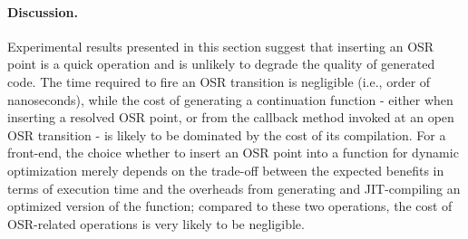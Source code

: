 \paragraph{Discussion.}

Experimental results presented in this section suggest that inserting an OSR point is a quick operation and is unlikely to degrade the quality of generated code. The time required to fire an OSR transition is negligible (i.e., order of nanoseconds), while the cost of generating a continuation function - either when inserting a resolved OSR point, or from the callback method invoked at an open OSR transition - is likely to be dominated by the cost of its compilation. For a front-end, the choice whether to insert an OSR point into a function for dynamic optimization merely depends on the trade-off between the expected benefits in terms of execution time and the overheads from generating and JIT-compiling an optimized version of the function; compared to these two operations, the cost of OSR-related operations is very likely to be negligible.

